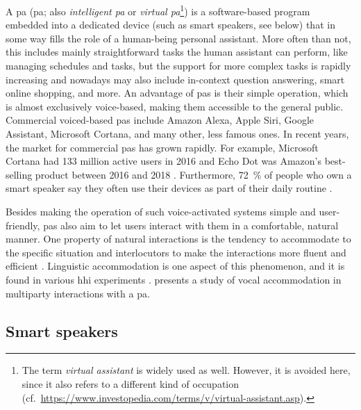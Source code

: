 A \acl{pa} (\acs{pa}; also \emph{intelligent \acl{pa}} or \emph{virtual \acl{pa}}\footnote{The term \emph{virtual assistant} is widely used as well.
However, it is avoided here, since it also refers to a different kind of occupation (cf.\ \url{https://www.investopedia.com/terms/v/virtual-assistant.asp}).}) is a software-based program embedded into a dedicated device (such as smart speakers, see below) that in some way fills the role of a human-being personal assistant.
More often than not, this includes mainly straightforward tasks the human assistant can perform, like managing schedules and tasks, but the support for more complex tasks is rapidly increasing and nowadays may also include in-context question answering, smart online shopping, and more.
An advantage of \acp{pa} is their simple operation, which is almost exclusively voice-based, making them accessible to the general public.
Commercial voiced-based \acp{pa} include Amazon Alexa, Apple Siri, Google Assistant, Microsoft Cortana, and many other, less famous ones.
In recent years, the market for commercial \acp{pa} has grown rapidly.
For example, Microsoft Cortana had 133 million active users in 2016 \citep{Osborne2016why} and Echo Dot was Amazon's best-selling product between 2016 and 2018 \citep{Dickey2017echo}.
Furthermore, \SI{72}{\percent} of people who own a smart speaker say they often use their devices as part of their daily routine \citep{Kleinberg2018ways}.

Besides making the operation of such voice-activated systems simple and user-friendly, \acp{pa} also aim to let users interact with them in a comfortable, natural manner.
One property of natural interactions is the tendency to accommodate to the specific situation and interlocutors to make the interactions more fluent and efficient \citep{Gallois2015CAT}.
Linguistic accommodation is one aspect of this phenomenon, and it is found in various \ac{hhi} experiments \citep[e.g.,][]{Pardo2017phonetic,Schweitzer2017social}.
 presents a study of vocal accommodation in multiparty interactions with a \ac{pa}.

\subsection{Smart speakers}
\label{subsec:smart_speakers}

